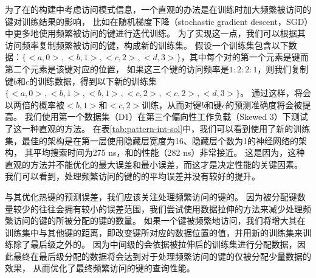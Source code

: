为了在{\li}的构建中考虑访问模式信息，一个直观的办法是在训练时加大频繁被访问的键对训练结果的影响，
比如在随机梯度下降（stochastic gradient descent，SGD）中更多地使用频繁被访问的键进行迭代训练。
为了实现这一点，我们可以根据其访问频率复制频繁被访问的键，构成新的训练集。
假设一个训练集包含以下数据：$\{<a, 0>, <b, 1>, <c, 2>, <d, 3>\}$，其中每个对的第一个元素是键而第二个元素是该键对应的位置，
如果这三个键的访问频率是$1:2:2:1$，则我们复制键$b$和$c$的训练数据，得到以下新的训练集$\{<a, 0>, <b, 1>, <b, 1>, <c, 2>, <c, 2>, <d, 3>\}$。
通过这样，{\model}将会以两倍的概率被$<b, 1>$和$<c, 2>$训练，从而对键$b$和键$c$的预测准确度将会被提高。
我们使用第一个数据集（D1）在第三个偏向性工作负载（Skewed 3）下测试了这一种直观的方法。
在表\ref{tab:pattern-int-sol}中，我们可以看到使用了新的训练集，最佳的{\li}架构是在第一层使用隐藏层宽度为16、隐藏层个数为1的神经网络的{\li}架构，
其平均搜索时间为275 ns，和{\li}的性能（282 ns）非常接近。
这是因为，这种直观的方法并不能优化{\model}的最大误差和最小误差，而这才是决定{\li}性能的关键因素。
我们可以看到，处理频繁访问的键的{\model}的平均误差并没有较好的提升。


与其优化热键的预测误差，我们应该关注处理频繁访问的键的{\model}。
因为被分配键数量较少的{\model}往往会拥有较小的误差范围，我们尝试使用数据拉伸的方法来减少处理频繁访问的键的{\model}所被分配的键的数量。
如果一个键被频繁地访问，我们将增大其在训练集中与其他键的距离，即改变键所对应的数据位置的值，并用新的训练集来训练除了最后级之外的{\model}。
因为中间级的{\model}会依据被拉伸后的训练集进行分配数据，因此最终在最后级分配的数据将会达到对于处理频繁访问的键的{\model}仅被分配少量数据的效果，
从而优化了最终频繁访问的键的查询性能。

